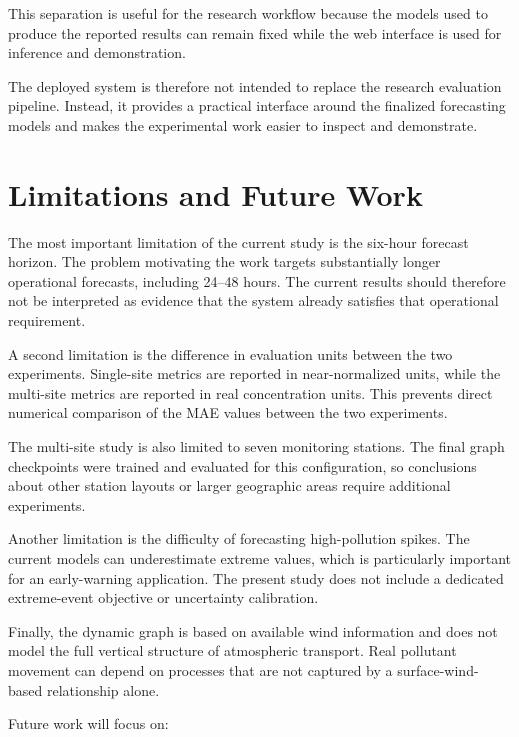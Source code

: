\documentclass[conference]{IEEEtran}
\begin{document}
This separation is useful for the research workflow because the models used to produce the
reported results can remain fixed while the web interface is used for inference and
demonstration.

The deployed system is therefore not intended to replace the research evaluation pipeline.
Instead, it provides a practical interface around the finalized forecasting models and makes
the experimental work easier to inspect and demonstrate.

\section{Limitations and Future Work}

The most important limitation of the current study is the six-hour forecast horizon. The
problem motivating the work targets substantially longer operational forecasts, including
24--48 hours. The current results should therefore not be interpreted as evidence that the
system already satisfies that operational requirement.

A second limitation is the difference in evaluation units between the two experiments.
Single-site metrics are reported in near-normalized units, while the multi-site metrics are
reported in real concentration units. This prevents direct numerical comparison of the MAE
values between the two experiments.

The multi-site study is also limited to seven monitoring stations. The final graph checkpoints
were trained and evaluated for this configuration, so conclusions about other station layouts
or larger geographic areas require additional experiments.

Another limitation is the difficulty of forecasting high-pollution spikes. The current models
can underestimate extreme values, which is particularly important for an early-warning
application. The present study does not include a dedicated extreme-event objective or
uncertainty calibration.

Finally, the dynamic graph is based on available wind information and does not model the full
vertical structure of atmospheric transport. Real pollutant movement can depend on processes
that are not captured by a surface-wind-based relationship alone.

Future work will focus on:
\end{document}
